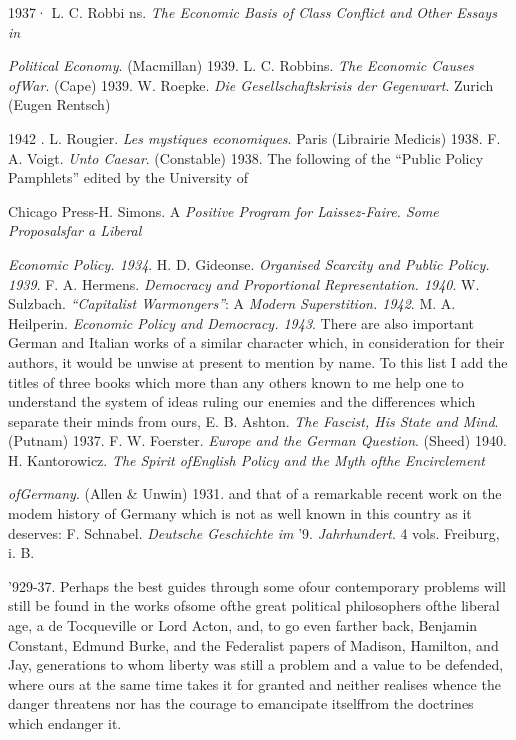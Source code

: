 \documentclass[11pt,openany]{book}
\begin{document}
1937· L. C. Robbi ns. \emph{The Economic Basis of Class Conflict and Other Essays in}

\emph{Political Economy}. (Macmillan) 1939. L. C. Robbins. \emph{The Economic Causes ofWar}. (Cape) 1939. W. Roepke. \emph{Die Gesellschaftskrisis der Gegenwart}. Zurich (Eugen Rentsch)

1942 . L. Rougier. \emph{Les mystiques economiques}. Paris (Librairie Medicis) 1938. F. A. Voigt. \emph{Unto Caesar}. (Constable) 1938. The following of the ``Public Policy Pamphlets'' edited by the University of

Chicago Press-H. Simons. A \emph{Positive Program for Laissez-Faire. Some Proposalsfar a Liberal}

\emph{Economic Policy. 1934}. H. D. Gideonse. \emph{Organised Scarcity and Public Policy. 1939}. F. A. Hermens. \emph{Democracy and Proportional Representation. 1940}. W. Sulzbach. \emph{``Capitalist Warmongers''}: A \emph{Modern Superstition. 1942}. M. A. Heilperin. \emph{Economic Policy and Democracy. 1943}. There are also important German and Italian works of a similar character which, in consideration for their authors, it would be unwise at present to mention by name. To this list I add the titles of three books which more than any others known to me help one to understand the system of ideas ruling our enemies and the differences which separate their minds from ours, E. B. Ashton. \emph{The Fascist, His State and Mind}. (Putnam) 1937. F. W. Foerster. \emph{Europe and the German Question}. (Sheed) 1940. H. Kantorowicz. \emph{The Spirit ofEnglish Policy and the Myth ofthe Encirclement}

\emph{ofGermany}. (Allen \& Unwin) 1931. and that of a remarkable recent work on the modem history of Germany which is not as well known in this country as it deserves: F. Schnabel. \emph{Deutsche Geschichte im} '9. \emph{Jahrhundert}. 4 vols. Freiburg, i. B.

'929-37. Perhaps the best guides through some ofour contemporary problems will still be found in the works ofsome ofthe great political philosophers ofthe liberal age, a de Tocqueville or Lord Acton, and, to go even farther back, Benjamin Constant, Edmund Burke, and the Federalist papers of Madison, Hamilton, and Jay, generations to whom liberty was still a problem and a value to be defended, where ours at the same time takes it for granted and neither realises whence the danger threatens nor has the courage to emancipate itselffrom the doctrines which endanger it.
\end{document}
